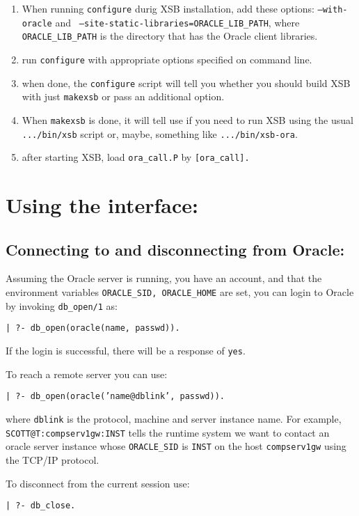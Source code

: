 \begin{enumerate}
\item When running {\tt configure} durig XSB installation, add these
  options: {\tt --with-oracle} and {\tt
    --site-static-libraries=ORACLE\_LIB\_PATH}, where {\tt
    ORACLE\_LIB\_PATH} is the directory that has the Oracle client
  libraries.
\item run {\tt configure} with appropriate options specified on command
  line.
\item when done, the {\tt configure} script will tell you  whether you
  should build XSB with just {\tt makexsb} or pass an additional option. 
\item When {\tt makexsb} is done, it will tell use if you need to run XSB
  using the usual {\tt .../bin/xsb} script or, maybe, something like
  {\tt .../bin/xsb-ora}.
\item after starting XSB, load {\tt ora\_call.P} by {\tt [ora\_call].}
\end{enumerate}

\section{Using the interface:}


\subsection{Connecting to and disconnecting from Oracle:}

Assuming the Oracle server is running, you have an account, and that
the environment variables {\tt ORACLE\_SID, ORACLE\_HOME} are set, you
can login to Oracle by invoking {\tt db\_open/1} as:
\begin{center}
{\tt  | ?- db\_open(oracle(name, passwd)).}
\end{center}
If the login is successful, there will be a response of {\tt yes}.

To reach a remote server you can use:
\begin{center}
{\tt  | ?- db\_open(oracle('name@dblink', passwd)).}
\end{center}
where {\tt dblink} is the protocol, machine and server instance name.
For example, \\ {\tt SCOTT@T:compserv1gw:INST} tells the runtime system we
want to contact an oracle server instance whose {\tt ORACLE\_SID} is
{\tt INST} on the host {\tt compserv1gw} using the TCP/IP protocol.

To disconnect from the current session use:
\begin{center}
{\tt  | ?- db\_close.}
\end{center}


